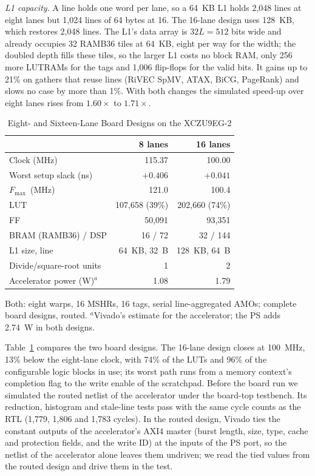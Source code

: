 \documentclass[journal]{IEEEtran}
\newcommand{\Fmax}{$F_{\max}$}
\begin{document}
\emph{L1 capacity.} A line holds one word per lane, so a 64~KB L1 holds 2,048 lines
at eight lanes but 1,024 lines of 64 bytes at 16. The 16-lane design uses 128~KB,
which restores 2,048 lines. The L1's data array is $32L = 512$ bits wide and already
occupies 32 RAMB36 tiles at 64~KB, eight per way for the width; the doubled depth
fills these tiles, so the larger L1 costs no block RAM, only 256 more LUTRAMs for the
tags and 1,006 flip-flops for the valid bits. It gains up to 21\% on gathers that
reuse lines (RiVEC SpMV, ATAX, BiCG, PageRank) and slows no case by more than 1\%. With both changes
the simulated speed-up over eight lanes rises from $1.60\times$ to $1.71\times$.

\begin{table}[t]
\caption{Eight- and Sixteen-Lane Board Designs on the XCZU9EG-2}
\label{tab:lanes16_impl}
\centering\footnotesize
\setlength{\tabcolsep}{4pt}
\begin{tabular}{lrr}
\toprule
 & 8 lanes & 16 lanes\\
\midrule
Clock (MHz)               & 115.37 & 100.00\\
Worst setup slack (ns)    & $+0.406$ & $+0.041$\\
\Fmax\ (MHz)              & 121.0 & 100.4\\
LUT                       & 107,658 (39\%) & 202,660 (74\%)\\
FF                        & 50,091 & 93,351\\
BRAM (RAMB36) / DSP       & 16 / 72 & 32 / 144\\
L1 size, line             & 64~KB, 32~B & 128~KB, 64~B\\
Divide/square-root units  & 1 & 2\\
Accelerator power (W)$^a$ & 1.08 & 1.79\\
\bottomrule
\end{tabular}

\vspace{2pt}
\begin{minipage}{\columnwidth}\footnotesize
Both: eight warps, 16 MSHRs, 16 tags, serial line-aggregated AMOs; complete board
designs, routed. $^a$Vivado's estimate for the accelerator; the PS adds 2.74~W in
both designs.
\end{minipage}
\end{table}

Table~\ref{tab:lanes16_impl} compares the two board designs. The 16-lane design
closes at 100~MHz, 13\% below the eight-lane clock, with 74\% of the LUTs and 96\% of
the configurable logic blocks in use; its worst path runs from a memory context's
completion flag to the write enable of the scratchpad. Before the board run we
simulated the routed netlist of the accelerator under the board-top testbench. Its
reduction, histogram and stale-line tests pass with the same cycle counts as the RTL
(1,779, 1,806 and 1,783 cycles). In the routed design, Vivado ties the constant
outputs of the accelerator's AXI4 master (burst length, size, type, cache and
protection fields, and the write ID) at the inputs of the PS port, so the netlist of
the accelerator alone leaves them undriven; we read the tied values from the routed
design and drive them in the test.
\end{document}
